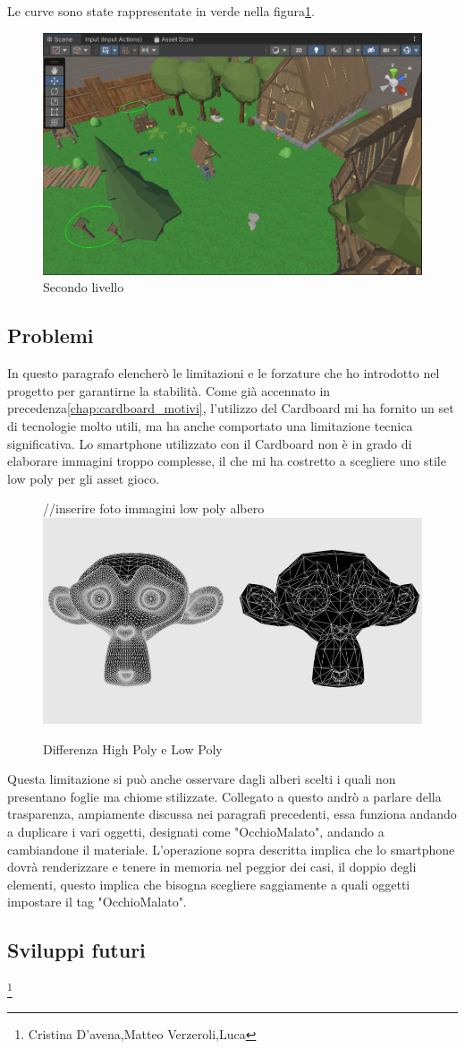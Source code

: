 \documentclass[10pt,a4paper]{article}
\begin{document}
    Le curve sono state rappresentate in verde nella figura\ref{fig:mappa}.
     \begin{figure}[H]
    	\centering
    	\includegraphics[width=0.8\linewidth]{image/mappa}
    	\caption{Secondo livello}
    	\label{fig:mappa}
    \end{figure}
    \subsection{Problemi}
    In questo paragrafo elencherò le limitazioni e le forzature che ho introdotto nel progetto per garantirne la stabilità. Come già accennato in precedenza\ref{chap:cardboard_motivi}, l'utilizzo del Cardboard mi ha fornito un set di tecnologie molto utili, ma ha anche comportato una limitazione tecnica significativa. Lo smartphone utilizzato con il Cardboard non è in grado di elaborare immagini troppo complesse, il che mi ha costretto a scegliere uno stile low poly per gli asset  gioco.
      \begin{figure}[H]//inserire foto immagini low poly albero
    	\centering
    	\includegraphics[width=0.8\linewidth]{image/low_hight}
    	\caption{Differenza High Poly e Low Poly  }
    	\label{fig:low_hight}
    \end{figure}
    Questa limitazione si può anche osservare dagli alberi scelti i quali non presentano foglie ma chiome stilizzate.
    Collegato a questo andrò a parlare della trasparenza, ampiamente discussa nei paragrafi precedenti, essa funziona andando a duplicare i vari oggetti, designati come "OcchioMalato", andando a cambiandone il materiale.
    L'operazione sopra descritta implica che lo smartphone dovrà renderizzare e tenere in memoria nel peggior dei casi, il doppio degli elementi, questo implica che bisogna scegliere saggiamente a quali oggetti impostare il tag "OcchioMalato".
    \subsection{Sviluppi futuri}
    
    \newpage
    \null
    \newpage
  
    
	
	
	
	\thanks{Cristina D'avena,Matteo Verzeroli,Luca }
\end{document}
